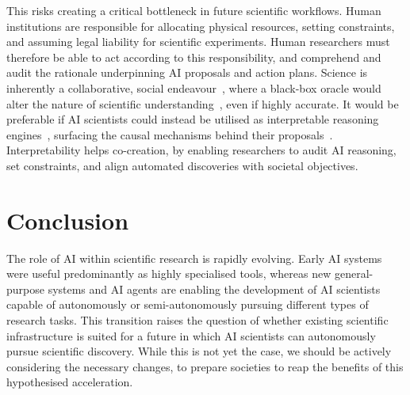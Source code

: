 \documentclass[11pt, a4paper, twocolumn, goog]{google}
\begin{document}
This risks creating a critical bottleneck in future scientific workflows. Human institutions are responsible for allocating physical resources, setting constraints, and assuming legal liability for scientific experiments. Human researchers must therefore be able to act according to this responsibility, and comprehend and audit the rationale underpinning AI proposals and action plans. Science is inherently a collaborative, social endeavour~\citep{channing2026ai}, where a black-box oracle would alter the nature of scientific understanding~\citep{sullivan2022understanding}, even if highly accurate. It would be preferable if AI scientists could instead be utilised as interpretable reasoning engines~\citep{truhn2023large}, surfacing the causal mechanisms behind their proposals~\citep{kiciman2023causal}. Interpretability helps co-creation, by enabling researchers to audit AI reasoning, set constraints, and align automated discoveries with societal objectives.

\section{Conclusion}
\label{sec:conclusion}

The role of AI within scientific research is rapidly evolving. Early AI systems were useful predominantly as highly specialised tools, whereas new general-purpose systems and AI agents are enabling the development of AI scientists capable of autonomously or semi-autonomously pursuing different types of research tasks. This transition raises the question of whether existing scientific infrastructure is suited for a future in which AI scientists can autonomously pursue scientific discovery. While this is not yet the case, we should be actively considering the necessary changes, to prepare societies to reap the benefits of this hypothesised acceleration.
\end{document}
